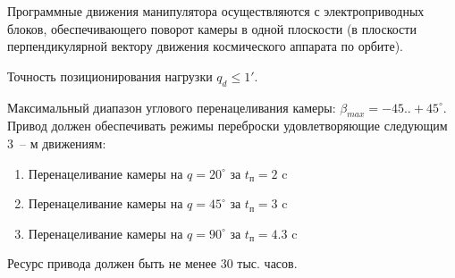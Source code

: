 Программные движения манипулятора осуществляются с электроприводных блоков,
обеспечивающего поворот камеры в одной плоскости (в плоскости перпендикулярной
вектору движения космического аппарата по орбите).

Точность позиционирования нагрузки $q_d \leq 1'$.

Максимальный диапазон углового перенацеливания камеры: $\beta_{max} = -45..+45^\circ$.
Привод должен обеспечивать режимы переброски удовлетворяющие следующим 3~-- м движениям:

\begin{enumerate}
    \item Перенацеливание камеры на $q = 20^\circ$ за $t_\textit{п} = 2  $ c
    \item Перенацеливание камеры на $q = 45^\circ$ за $t_\textit{п} = 3  $ c
    \item Перенацеливание камеры на $q = 90^\circ$ за $t_\textit{п} = 4.3$ c
\end{enumerate}

Ресурс привода должен быть не менее 30 тыс. часов.
